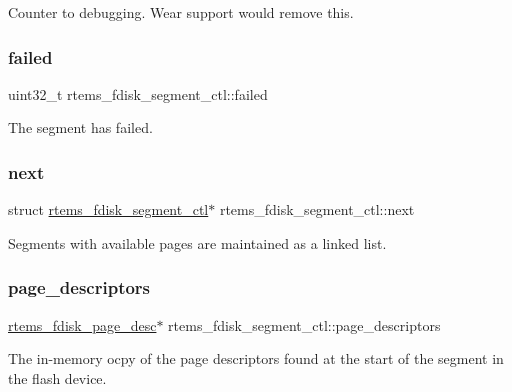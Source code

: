 Counter to debugging. Wear support would remove this. \mbox{\label{structrtems__fdisk__segment__ctl_a66c4b76d4b78004d603aa05a14a9ac07}} 
\subsubsection{\texorpdfstring{failed}{failed}}
{\footnotesize\ttfamily uint32\+\_\+t rtems\+\_\+fdisk\+\_\+segment\+\_\+ctl\+::failed}

The segment has failed. \mbox{\label{structrtems__fdisk__segment__ctl_a522eb0283ef89f20625143595bb7b334}} 
\subsubsection{\texorpdfstring{next}{next}}
{\footnotesize\ttfamily struct \mbox{\hyperlink{structrtems__fdisk__segment__ctl}{rtems\+\_\+fdisk\+\_\+segment\+\_\+ctl}}$\ast$ rtems\+\_\+fdisk\+\_\+segment\+\_\+ctl\+::next}

Segments with available pages are maintained as a linked list. \mbox{\label{structrtems__fdisk__segment__ctl_a584c00d3cb5ff60b49821efa741c73c8}} 
\subsubsection{\texorpdfstring{page\_descriptors}{page\_descriptors}}
{\footnotesize\ttfamily \mbox{\hyperlink{structrtems__fdisk__page__desc}{rtems\+\_\+fdisk\+\_\+page\+\_\+desc}}$\ast$ rtems\+\_\+fdisk\+\_\+segment\+\_\+ctl\+::page\+\_\+descriptors}

The in-\/memory ocpy of the page descriptors found at the start of the segment in the flash device. \mbox{\label{structrtems__fdisk__segment__ctl_a859e26b4f6303684875fec8b34740604}} 
